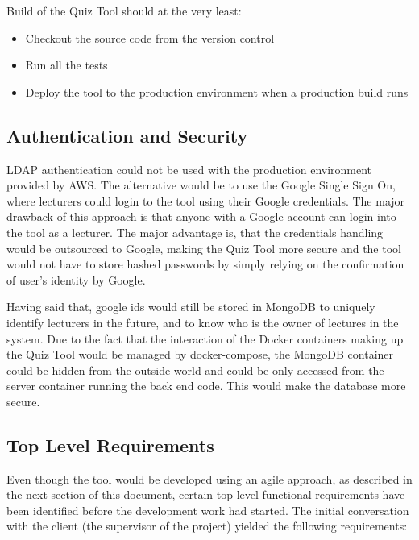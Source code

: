 Build of the Quiz Tool should at the very least:
\begin{itemize}
  \item Checkout the source code from the version control
  \item Run all the tests
  \item Deploy the tool to the production environment when a production build runs
\end{itemize}

\subsection{Authentication and Security}
LDAP authentication could not be used with the production environment provided by
AWS. The alternative would be to use the Google Single Sign On\cite{2}, where lecturers
could login to the tool using their Google credentials. The major drawback of this
approach is that anyone with a Google account can login into the tool as a lecturer.
The major advantage is, that the credentials handling would be outsourced to Google,
making the Quiz Tool more secure and the tool would not have to store hashed passwords
by simply relying on the confirmation of user's identity by Google.

Having said that, google ids would still be stored in MongoDB to uniquely identify
lecturers in the future, and to know who is the owner of lectures in the system.
Due to the fact that the interaction of the Docker containers making up the Quiz Tool would
be managed by docker-compose, the MongoDB container could be hidden from the outside world
and could be only accessed from the server container running the back end code. This would
make the database more secure.

\subsection{Top Level Requirements}
Even though the tool would be developed using an agile approach, as described in the next
section of this document, certain top level functional requirements have been identified
before the development work had started. The initial conversation with the client (the
supervisor of the project) yielded the following requirements:

